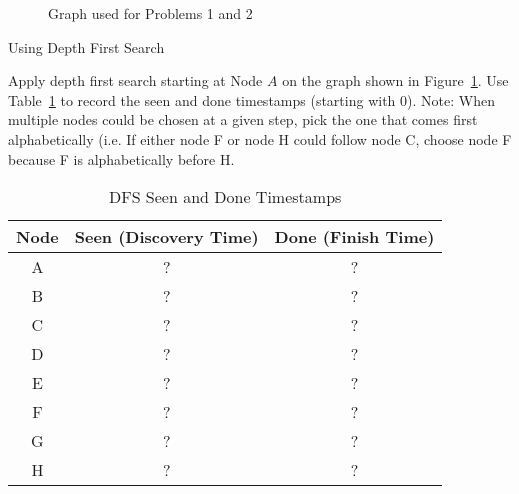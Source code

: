 \documentclass[10pt]{article}
\begin{document}
\thispagestyle{empty}
\handout



\begin{figure}[h]
    \centering
    \caption{Graph used for Problems 1 and 2}
    \label{fig:graph_1_2}
\end{figure}



\begin{problem} Using Depth First Search \end{problem}

Apply depth first search starting at Node $A$ on the graph shown in Figure~\ref{fig:graph_1_2}. Use Table~\ref{tab:dfs_times} to record the seen and done timestamps (starting with 0). Note: When multiple nodes could be chosen at a given step, pick the one that comes first alphabetically (i.e. If either node F or node H could follow node C, choose node F because F is alphabetically before H.

\begin{table}[H]
    \centering
    \begin{tabular}{c|c|c}
        \toprule
        \textbf{Node} & \textbf{Seen (Discovery Time)} & \textbf{Done (Finish Time)} \\
        \midrule
        A & ?  & ? \\ %
        B & ?  & ? \\
        C & ?  & ? \\
        D & ?  & ? \\
        E & ?  & ? \\
        F & ?  & ? \\
        G & ?  & ? \\
        H & ?  & ? \\
        \bottomrule
    \end{tabular}
    \caption{DFS Seen and Done Timestamps}
    \label{tab:dfs_times}
\end{table}
\end{document}
